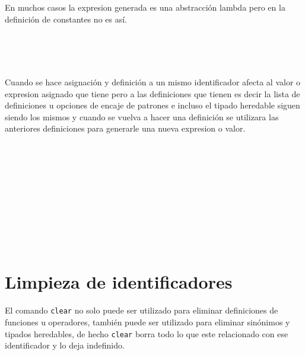      En muchos casos la expresion generada es una abstracción lambda pero en la definición de constantes no es así.
      
      \begin{fxcode}
         \\
         \\
         \\
          
      \end{fxcode}
      
      Cuando se hace asignación y definición a un mismo identificador afecta al valor o expresion asignado que tiene pero a las definiciones que tienen es decir la lista de definiciones u opciones de encaje de patrones e incluso el tipado heredable siguen siendo los mismos y cuando se vuelva a hacer una definición se utilizara las anteriores definiciones para generarle una nueva expresion o valor.
      
      \begin{fxcode}
         \\
         \\
         \\
         \\
         \\
         \\
         \\
         \\
         \\
      \end{fxcode}
      
   \section{Limpieza de identificadores}
      El comando \texttt{clear} no solo puede ser utilizado para eliminar definiciones de funciones u operadores, también puede ser utilizado para eliminar sinónimos y tipados heredables, de hecho \texttt{clear} borra todo lo que este relacionado con ese identificador y lo deja indefinido.
      \\
      
